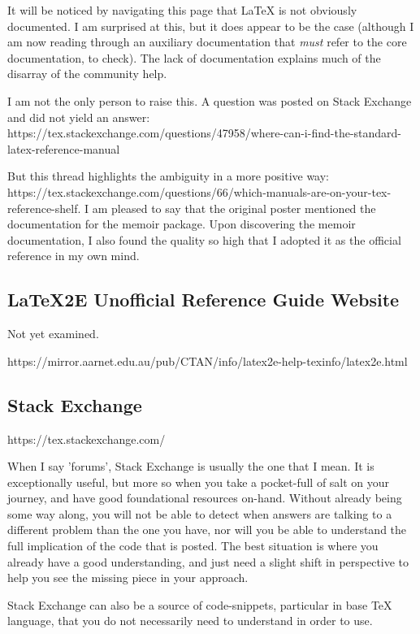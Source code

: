 \documentclass[12pt, oneside]{memoir}
\begin{document}
It will be noticed by navigating this page that LaTeX is not obviously documented. I am surprised at this, but it does appear to be the case (although I am now reading through an auxiliary documentation that \emph{must} refer to the core documentation, to check). The lack of documentation explains much of the disarray of the community help.

I am not the only person to raise this. A question was posted on Stack Exchange and did not yield an answer: https://tex.stackexchange.com/questions/47958/where-can-i-find-the-standard-latex-reference-manual

But this thread highlights the ambiguity in a more positive way: https://tex.stackexchange.com/questions/66/which-manuals-are-on-your-tex-reference-shelf. I am pleased to say that the original poster mentioned the documentation for the memoir package. Upon discovering the memoir documentation, I also found the quality so high that I adopted it as the official reference in my own mind.

\subsection{LaTeX2E Unofficial Reference Guide Website}

Not yet examined.

https://mirror.aarnet.edu.au/pub/CTAN/info/latex2e-help-texinfo/latex2e.html

\subsection{Stack Exchange}

https://tex.stackexchange.com/

When I say 'forums', Stack Exchange is usually the one that I mean. It is exceptionally useful, but more so when you take a pocket-full of salt on your journey, and have good foundational resources on-hand. Without already being some way along, you will not be able to detect when answers are talking to a different problem than the one you have, nor will you be able to understand the full implication of the code that is posted. The best situation is where you already have a good understanding, and just need a slight shift in perspective to help you see the missing piece in your approach.

Stack Exchange can also be a source of code-snippets, particular in base TeX language, that you do not necessarily need to understand in order to use.
\end{document}
